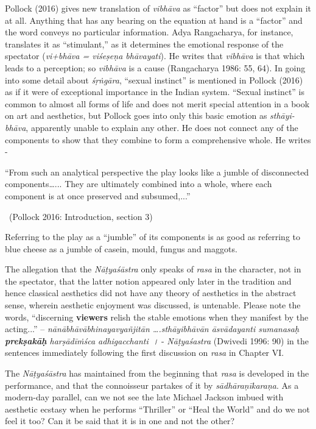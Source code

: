 Pollock (2016) gives new translation of \textit{vibhāva} as “factor” but does not explain it at all. Anything that has any bearing on the equation at hand is a “factor” and the word conveys no particular information. Adya Rangacharya, for instance, translates it as “stimulant,” as it determines the emotional response of the spectator (\textit{vi+bhāva = viśeṣeṇa bhāvayati}). He writes that \textit{vibhāva} is that which leads to a perception; so \textit{vibhāva} is a cause (Rangacharya 1986: 55, 64). In going into some detail about \textit{śṛṅgāra}, “sexual instinct” is mentioned in Pollock (2016) as if it were of exceptional importance in the Indian system. “Sexual instinct” is common to almost all forms of life and does not merit special attention in a book on art and aesthetics, but Pollock goes into only this basic emotion as \textit{sthāyi-bhāva}, apparently unable to explain any other. He does not connect any of the components to show that they combine to form a comprehensive whole. He writes -

\begin{myquote}
“From such an analytical perspective the play looks like a jumble of disconnected components…... They are ultimately combined into a whole, where each component is at once preserved and subsumed,...” 

~\hfill (Pollock 2016: Introduction, section 3)
\end{myquote}

Referring to the play as a “jumble” of its components is as good as referring to blue cheese as a jumble of casein, mould, fungus and maggots.

The allegation that the \textit{Nāṭyaśāstra} only speaks of \textit{rasa} in the character, not in the spectator, that the latter notion appeared only later in the tradition and hence classical aesthetics did not have any theory of aesthetics in the abstract sense, wherein aesthetic enjoyment was discussed, is untenable. Please note the words, “discerning \textbf{viewers} relish the stable emotions when they manifest by the acting...” -- \textit{nānābhāvābhinayavyañjitān ….sthāyibhāvān āsvādayanti sumanasaḥ \textbf{prekṣakāḥ} harṣādīṁśca adhigacchanti~{\dev ।}} - \textit{Nāṭyaśastra} (Dwivedi 1996: 90) in the sentences immediately following the first discussion on \textit{rasa }in Chapter VI.

The \textit{Nāṭyaśāstra} has maintained from the beginning that \textit{rasa} is developed in the performance, and that the connoisseur partakes of it by \textit{sādhāraṇīkaraṇa}. As a modern-day parallel, can we not see the late Michael Jackson imbued with aesthetic ecstasy when he performs “Thriller” or “Heal the World” and do we not feel it too? Can it be said that it is in one and not the other?


